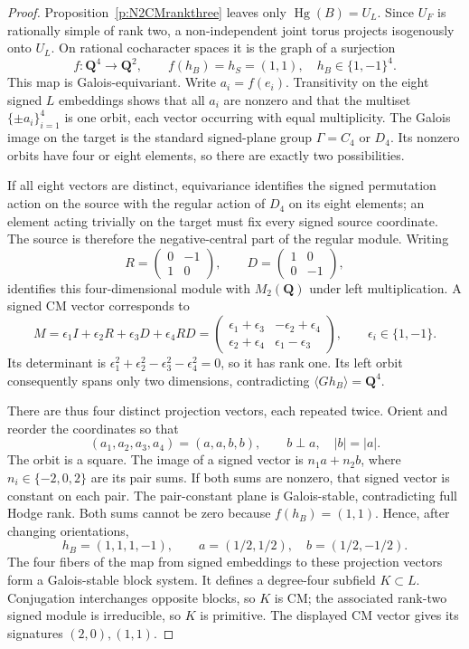 \documentclass[10pt,reqno]{article}
\theoremstyle{emphasizedplain}
\theoremstyle{emphasizeddefinition}
\theoremstyle{emphasizeddefinition}
\DeclareMathOperator{\Hg}{Hg}
\newcommand{\Q}{\mathbf Q}
\begin{document}
\begin{proof}
Proposition~\ref{p:N2CMrankthree} leaves only $\Hg(B)=U_L$.
Since $U_F$ is rationally simple of rank two, a non-independent
joint torus projects isogenously onto $U_L$. On rational
cocharacter spaces it is the graph of a surjection
\[
 f:\Q^4\longrightarrow\Q^2,\qquad f(h_B)=h_S=(1,1),
 \quad h_B\in\{1,-1\}^4.
\]
This map is Galois-equivariant. Write $a_i=f(e_i)$.
Transitivity on the eight signed $L$ embeddings shows that all
$a_i$ are nonzero and that the multiset $\{\pm a_i\}_{i=1}^4$
is one orbit, each vector occurring with equal multiplicity.
The Galois image on the target is the standard signed-plane
group $\Gamma=C_4$ or $D_4$. Its nonzero orbits have four or
eight elements, so there are exactly two possibilities.

If all eight vectors are distinct, equivariance identifies the
signed permutation action on the source with the regular action
of $D_4$ on its eight elements; an element acting trivially on
the target must fix every signed source coordinate. The source
is therefore the negative-central part of the regular module.
Writing
\[
 R=\begin{pmatrix}0&-1\\1&0\end{pmatrix},\qquad
 D=\begin{pmatrix}1&0\\0&-1\end{pmatrix},
\]
identifies this four-dimensional module with $M_2(\Q)$ under
left multiplication. A signed CM vector corresponds to
\[
 M=\epsilon_1 I+\epsilon_2 R+\epsilon_3 D+\epsilon_4 RD
 =\begin{pmatrix}
 \epsilon_1+\epsilon_3&-\epsilon_2+\epsilon_4\\
 \epsilon_2+\epsilon_4&\epsilon_1-\epsilon_3
 \end{pmatrix},\qquad \epsilon_i\in\{1,-1\}.
\]
Its determinant is
$\epsilon_1^2+\epsilon_2^2-\epsilon_3^2-\epsilon_4^2=0$,
so it has rank one. Its left orbit consequently spans only two
dimensions, contradicting $\langle Gh_B\rangle=\Q^4$.

There are thus four distinct projection vectors, each repeated
twice. Orient and reorder the coordinates so that
\[
 (a_1,a_2,a_3,a_4)=(a,a,b,b),\qquad b\perp a,\quad |b|=|a|.
\]
The orbit is a square. The image of a signed vector is $n_1a+n_2b$,
where $n_i\in\{-2,0,2\}$ are its pair sums. If both sums are
nonzero, that signed vector is constant on each pair. The
pair-constant plane is Galois-stable, contradicting full Hodge
rank. Both sums cannot be zero because $f(h_B)=(1,1)$.
Hence, after changing orientations,
\[
 h_B=(1,1,1,-1),\qquad
 a=(1/2,1/2),\quad b=(1/2,-1/2).
\]
The four fibers of the map from signed embeddings to these
projection vectors form a Galois-stable block system. It defines
a degree-four subfield $K\subset L$. Conjugation interchanges
opposite blocks, so $K$ is CM; the associated rank-two signed
module is irreducible, so $K$ is primitive. The displayed CM
vector gives its signatures $(2,0),(1,1)$.


\end{proof}
\end{document}

